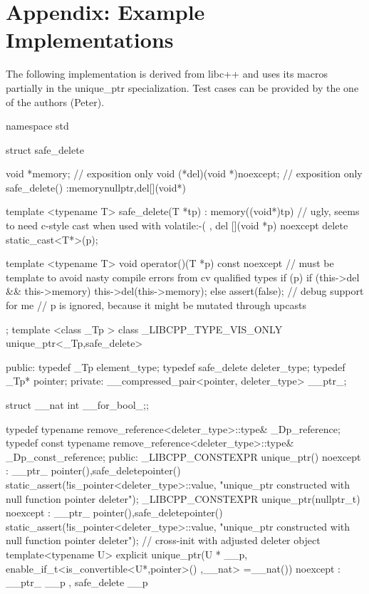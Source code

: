 \documentclass[ebook,11pt,article]{memoir}
\begin{document}
\chapter{Appendix: Example Implementations}
The following implementation is derived from libc++ and uses its macros partially in the unique_ptr specialization. Test cases can be provided by the one of the authors (Peter).

\begin{codeblock}
namespace std{
struct safe_delete {

	void *memory; // exposition only
	void (*del)(void *)noexcept; // exposition only
	safe_delete()
	:memory{nullptr},del{[](void*){}}{}

	template <typename T>
	safe_delete(T *tp)
	    : memory((void*)tp) // ugly, seems to need c-style cast when used with volatile:-(
        , del { [](void *p) noexcept {delete static_cast<T*>(p);} } {}

    template <typename T>
    void operator()(T *p) const noexcept 
    // must be template to avoid nasty compile errors from cv qualified types
    {
        if (p) {
            if (this->del && this->memory) {
                this->del(this->memory);
            } else {
                assert(false);  // debug support for me
            }
        }
    } // p is ignored, because it might be mutated through upcasts
};
template <class _Tp >
class _LIBCPP_TYPE_VIS_ONLY unique_ptr<_Tp,safe_delete>
{
public:
    typedef _Tp element_type;
    typedef safe_delete deleter_type;
    typedef _Tp* pointer;
private:
    __compressed_pair<pointer, deleter_type> __ptr_;

    struct __nat {int __for_bool_;};

    typedef       typename remove_reference<deleter_type>::type& _Dp_reference;
    typedef const typename remove_reference<deleter_type>::type& _Dp_const_reference;
public:
     _LIBCPP_CONSTEXPR unique_ptr() noexcept
    : __ptr_ {pointer(),safe_delete{pointer()}}
        {
            static_assert(!is_pointer<deleter_type>::value,
                "unique_ptr constructed with null function pointer deleter");
        }
     _LIBCPP_CONSTEXPR unique_ptr(nullptr_t) noexcept
    : __ptr_ {pointer(),safe_delete{pointer()}}
        {
            static_assert(!is_pointer<deleter_type>::value,
                "unique_ptr constructed with null function pointer deleter");
        }
    // cross-init with adjusted deleter object
    template<typename U>
     explicit unique_ptr(U * __p,
            enable_if_t<is_convertible<U*,pointer>{}()
            ,__nat> =__nat()) noexcept
            : __ptr_ {__p
            , safe_delete {__p}}
        {
        }

}}
\end{codeblock}
\end{document}

